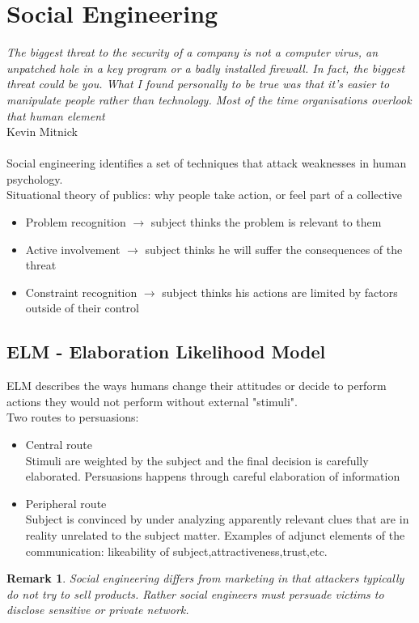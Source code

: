 \documentclass[10pt,a4paper]{book}
\newtheorem{remark}{Remark}
\begin{document}
\section{Social Engineering}
\textit{The biggest threat to the security of a company is 
not a computer virus, an unpatched hole in a key 
program or a badly installed firewall. In fact, the 
biggest threat could be you. What I found personally 
to be true was that it's easier to manipulate  people 
rather than technology. Most of the time 
organisations overlook that human element}\\
Kevin Mitnick\\\\
Social engineering identifies a set of techniques that attack weaknesses in human psychology.\\
Situational theory of publics: why people take action, or feel part of a collective
\begin{itemize}
\item Problem recognition $\to$ subject thinks the problem is relevant to them
\item Active involvement $\to$ subject thinks he will suffer the consequences of the threat
\item Constraint recognition $\to$ subject thinks his actions are limited by factors outside of their control
\end{itemize}
\subsection{ELM - Elaboration Likelihood Model}
ELM describes the ways humans change their attitudes or decide to perform actions they would not perform without external "stimuli".\\
Two routes to persuasions:
\begin{itemize}
\item Central route\\
Stimuli are weighted by the subject and the final decision is carefully elaborated. Persuasions happens through careful elaboration of information
\item Peripheral route\\
Subject is convinced by under analyzing apparently relevant clues that are in reality unrelated to the subject matter. Examples of adjunct elements of the communication: likeability of subject,attractiveness,trust,etc.
\end{itemize}
\begin{remark}
Social engineering differs from marketing in that attackers typically do not try to sell products. Rather social engineers must persuade victims to disclose sensitive or private network.
\end{remark}
\end{document}
